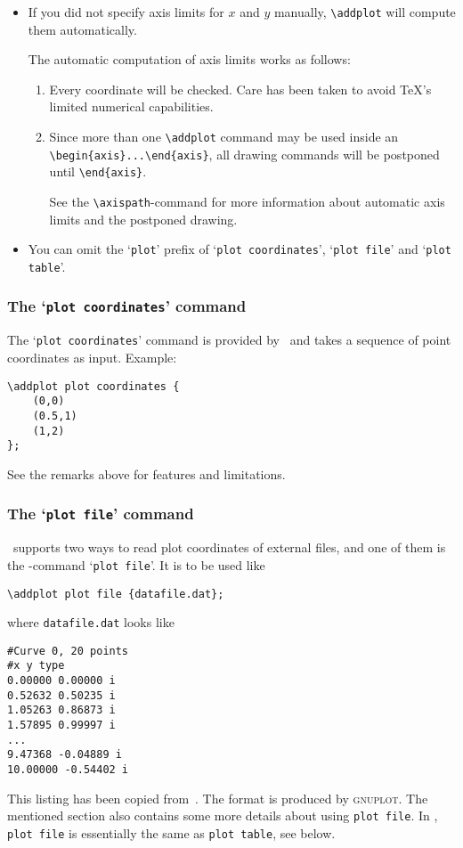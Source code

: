 \begin{itemize}
	\item If you did not specify axis limits for $x$ and $y$ manually, \lstinline!\addplot! will compute them automatically. 

	The automatic computation of axis limits works as follows:
		\begin{enumerate}
			\item Every coordinate will be checked. Care has been taken to avoid \TeX's limited numerical capabilities.
			\item Since more than one \lstinline!\addplot! command may be used inside an \lstinline!\begin{axis}...\end{axis}!, all drawing commands will be postponed until \lstinline!\end{axis}!.

			See the \lstinline!\axispath!-command for more information about automatic axis limits and the postponed drawing.
		\end{enumerate}

	\item You can omit the `\texttt{plot}' prefix of `\texttt{plot coordinates}', `\texttt{plot file}' and `\texttt{plot table}'.
\end{itemize}

\subsubsection{The `\texttt{plot coordinates}' command}
The `\texttt{plot coordinates}' command is provided by \Tikz\ and takes a sequence of point coordinates as input. Example:
\begin{lstlisting}
\addplot plot coordinates {
	(0,0)
	(0.5,1)
	(1,2)
};
\end{lstlisting}
See the remarks above for features and limitations.

\subsubsection{The `\texttt{plot file}' command}
\PGFPlots\ supports two ways to read plot coordinates of external files, and one of them is the \Tikz-command `\texttt{plot file}'. It is to be used like
\begin{lstlisting}
\addplot plot file {datafile.dat};
\end{lstlisting}
where \texttt{datafile.dat} looks like
\begin{lstlisting}
#Curve 0, 20 points
#x y type
0.00000 0.00000 i
0.52632 0.50235 i
1.05263 0.86873 i
1.57895 0.99997 i
...
9.47368 -0.04889 i
10.00000 -0.54402 i
\end{lstlisting}
This listing has been copied from~\cite[section~16.4]{tikz}. The format is produced by \textsc{gnuplot}. The mentioned section also contains some more details about using \texttt{plot file}. In \PGFPlots, \texttt{plot file} is essentially the same as \texttt{plot table}, see below.

